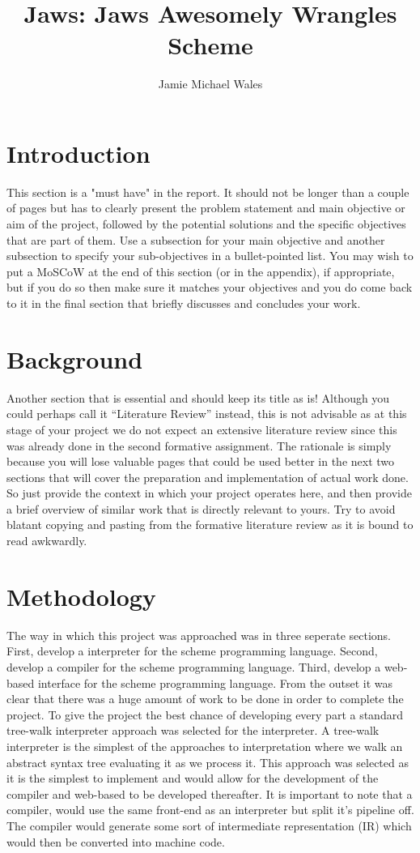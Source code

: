 \documentclass[final]{cmpreport_02}
\title{Jaws: Jaws Awesomely Wrangles Scheme}
\author{Jamie Michael Wales}
\begin{document}
\section{Introduction}

This section is a "must have" in the report. It should not be longer than a couple of pages but has to  clearly present the problem statement and main objective or aim of the project, followed by the potential solutions and the specific objectives that are part of them. Use a subsection for your main objective and another subsection to specify your sub-objectives in a bullet-pointed list. You may wish to put a MoSCoW at the end of this section (or in the appendix), if appropriate, but if you do so then make sure it matches your objectives and you do come back to it in the final section that briefly discusses and concludes your work.

\section{Background}

Another section that is essential and should keep its title as is! Although you could perhaps call it ``Literature Review'' instead, this is not advisable as at this stage of your project we do not expect an extensive literature review since this was already done in the second formative assignment. The rationale is simply because you will lose valuable pages that could be used better in the next two sections that will cover the preparation and implementation of actual work done. So just provide the context in which your project operates here, and then provide a brief overview of similar work that is directly relevant to yours. Try to avoid blatant copying and pasting from the formative literature review as it is bound to read awkwardly.

\section{Methodology}

The way in which this project was approached was in three seperate sections. First, develop a interpreter for the scheme programming language. Second, develop a compiler for the scheme programming language. Third, develop a web-based interface for the scheme programming language.
From the outset it was clear that there was a huge amount of work to be done in order to complete the project. To give the project the best chance of developing every part a standard tree-walk interpreter approach was selected for the interpreter.
A tree-walk interpreter is the simplest of the approaches to interpretation where we walk an abstract syntax tree evaluating it as we process it. This approach was selected as it is the simplest to implement and would allow for the development of the compiler and web-based to be developed thereafter.
It is important to note that a compiler, would use the same front-end as an interpreter but split it's pipeline off. The compiler would generate some sort of intermediate representation (IR) which would then be converted into machine code.
\end{document}
